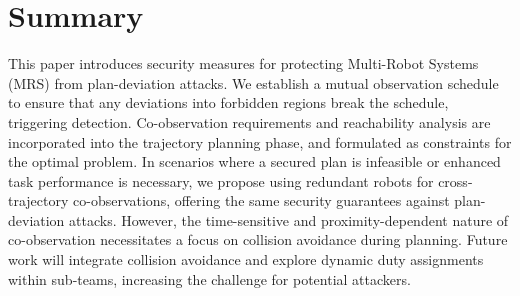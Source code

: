 \documentclass[10pt,twocolumn,twoside]{IEEEtran}
\begin{document}

\section{Summary}\label{sec:summary}

This paper introduces security measures for protecting Multi-Robot Systems (MRS) from plan-deviation attacks. We establish a mutual observation schedule to ensure that any deviations into forbidden regions break the schedule, triggering detection. Co-observation requirements and reachability analysis are incorporated into the trajectory planning phase, and formulated as constraints for the optimal problem. In scenarios where a secured plan is infeasible or enhanced task performance is necessary, we propose using redundant robots for cross-trajectory co-observations, offering the same security guarantees against plan-deviation attacks. However, the time-sensitive and proximity-dependent nature of co-observation necessitates a focus on collision avoidance during planning. Future work will integrate collision avoidance and explore dynamic duty assignments within sub-teams, increasing the challenge for potential attackers.

\end{document}
